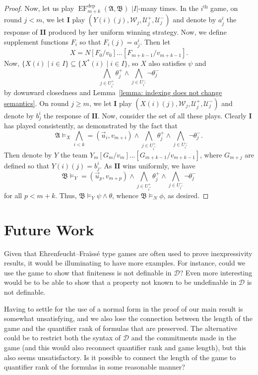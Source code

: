 \documentclass[12pt]{article}
\theoremstyle{definition}
\newcommand{\playerone}{\mathrm{\mathbf{I}}}
\newcommand{\playertwo}{\mathrm{\mathbf{II}}}
\DeclareMathOperator{\EF}{EF}
\newcommand{\EFdep}{\EF^{\mathrm{dep}}}
\newcommand{\W}{\mathcal W}
\newcommand{\U}{\mathcal U}
\newcommand{\A}{\mathfrak{A}}
\newcommand{\B}{\mathfrak{B}}
\newcommand{\dep}{\mathop{=}}
\newcommand{\deplog}{\mathcal D}
\begin{document}
\begin{proof}
    Now, let us play $\EFdep_{m+k}(\A,\B)$ $|I|$-many times. In the $i^{\text{th}}$ game, on round $j<m$, we let $\playerone$ play $(Y(i)(j),\W_j,\U^+_j,\U^-_j)$ and denote by $a^i_j$ the response of $\playertwo$ produced by her uniform winning strategy. Now, we define supplement functions $F_i$ so that $F_i(j) = a^i_j$. Then let
    \[
        X = N[F_0/v_0]\dots[F_{m+k-1}/v_{m+k-1}].
    \]
    Now, $\{X(i) \mid i\in I\}\subseteq\{X^*(i) \mid i\in I\}$, so $X$ also satisfies $\psi$ and 
    \[
        \bigwedge_{j\in U^+_{i^*}}\theta^+_j \land \bigwedge_{j\in U^-_{i^*}}\neg\theta^-_j
    \]
    by downward closedness and Lemma~\ref{lemma: indexing does not change semantics}. On round $j\geq m$, we let $\playerone$ play
    $(X(i)(j),\W_j,\U^+_j,\U^-_j)$ and denote by $b^i_j$ the response of $\playertwo$. Now, consider the set of all these plays. Clearly $\playerone$ has played consistently, as demonstrated by the fact that
    \[
        \A\models_X\bigwedge_{i<k}\dep(\vec u_i,v_{m+i})\land\bigwedge_{j\in U^+_{i^*}}\theta^+_j \land \bigwedge_{j\in U^-_{i^*}}\neg\theta^-_j.
    \]
    Then denote by $Y$ the team $Y_m[G_m/v_m]\dots[G_{m+k-1}/v_{m+k-1}]$, where $G_{m+j}$ are defined so that $Y(i)(j) = b^i_j$. As $\playertwo$ wins uniformly, we have
    \[
        \B\models_Y\dep(\vec u_p,v_{m+p})\land\bigwedge_{j\in U^+_{i^*}}\theta^+_j \land \bigwedge_{j\in U^-_{i^*}}\neg\theta^-_j
    \]
    for all $p<m+k$. Thus, $\B\models_Y\psi\land\theta$, whence $\B\models_N\phi$, as desired.
\end{proof}





\section{Future Work}

Given that Ehrenfeucht--Fraïssé type games are often used to prove inexpressivity results, it would be illuminating to have more examples. For instance, could we use the game to show that finiteness is not definable in $\deplog$? Even more interesting would be to be able to show that a property not known to be undefinable in $\deplog$ is not definable.

Having to settle for the use of a normal form in the proof of our main result is somewhat unsatisfying, and we also lose the connection between the length of the game and the quantifier rank of formulas that are preserved. The alternative could be to restrict both the syntax of $\deplog$ and the commitments made in the game (and this would also reconnect quantifier rank and game length), but this also seems unsatisfactory. Is it possible to connect the length of the game to quantifier rank of the formulas in some reasonable manner?
\end{document}
